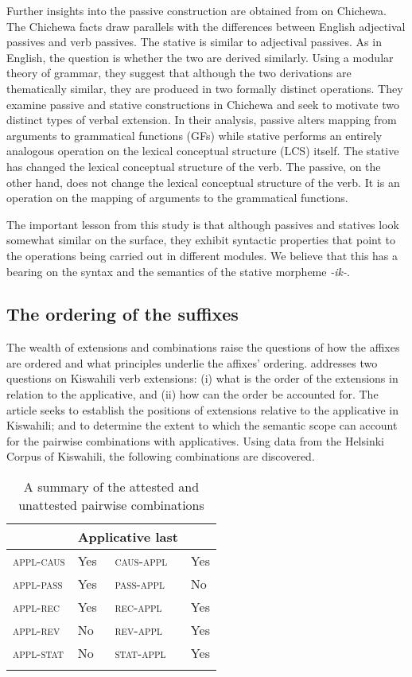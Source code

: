 \documentclass[output=paper]{langscibook}
\begin{document}
Further insights into the passive construction are obtained from \citet{Dubinsky:1996} on Chichewa. The Chichewa facts draw parallels with the differences between English adjectival passives and verb passives. The stative is similar to adjectival passives. As in English, the question is whether the two are derived similarly. Using a modular theory of grammar, they suggest that although the two derivations are thematically similar, they are produced in two formally distinct operations. They examine passive and stative constructions in Chichewa and seek to motivate two distinct types of verbal extension. In their analysis, passive alters mapping from arguments to grammatical functions (GFs) while stative performs an entirely analogous operation on the lexical conceptual structure (LCS) itself. The stative has changed the lexical conceptual structure of the verb. The passive, on the other hand, does not change the lexical conceptual structure of the verb. It is an operation on the mapping of arguments to the grammatical functions. 

The important lesson from this study is that although passives and statives look somewhat similar on the surface, they exhibit syntactic properties that point to the operations being carried out in different modules. We believe that this has a bearing on the syntax and the semantics of the stative morpheme \textit{-ik-}. 

\subsection {The ordering of the suffixes}
The wealth of extensions and combinations raise the questions of how the affixes are ordered and what principles underlie the affixes' ordering. \citet{Ngonyani:2016aa} addresses two questions on Kiswahili verb extensions: (i) what is the order of the extensions in relation to the applicative, and (ii) how can the order be accounted for. The article seeks to establish the positions of extensions relative to the applicative in Kiswahili;  and to determine the extent to which the semantic scope can account for the pairwise combinations with applicatives. Using data from the Helsinki Corpus of Kiswahili, the following combinations are discovered.  

\begin{table}
\begin{tabular}{ llll }
 \lsptoprule
  \multicolumn{2}{c}{Applicative first} & \multicolumn{2}{c}{Applicative last}   \\
 \midrule
 \textsc{appl-caus} & Yes & \textsc{caus-appl} & Yes \\
 \textsc{appl-pass} & Yes & \textsc{pass-appl} & No\\
 \textsc{appl-rec} & Yes & \textsc{rec-appl} & Yes\\
 \textsc{appl-rev} & No & \textsc{rev-appl} & Yes\\
 \textsc{appl-stat} & No & \textsc{stat-appl} & Yes\\
 \lspbottomrule
\end{tabular}
    \caption{A summary of the attested and unattested pairwise combinations \citep[65]{Ngonyani:2016aa}\label{table3}}
\end{table}
\end{document}
